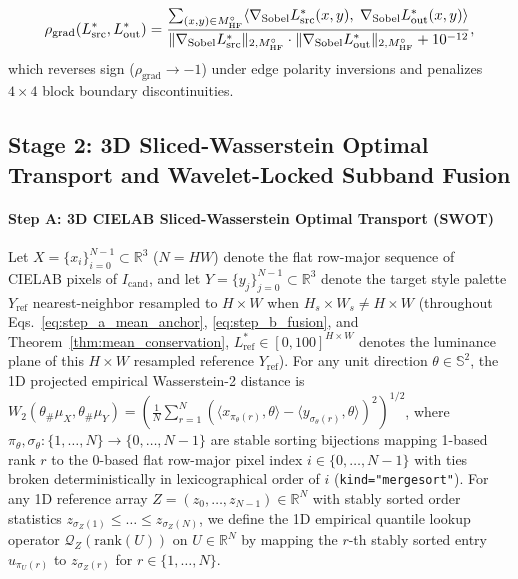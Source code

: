 \documentclass[conference,10pt]{IEEEtran}
\begin{document}
\begin{equation}
\label{eq:sobel_corr}
\resizebox{0.89\columnwidth}{!}{$\displaystyle
\rho_{\text{grad}}(L^*_{\text{src}}, L^*_{\text{out}}) = \frac{\sum_{(x,y) \in M_{\text{HF}}^\circ} \langle \nabla_{\text{Sobel}} L^*_{\text{src}}(x,y),\; \nabla_{\text{Sobel}} L^*_{\text{out}}(x,y) \rangle}{\|\nabla_{\text{Sobel}} L^*_{\text{src}}\|_{2, M_{\text{HF}}^\circ} \cdot \|\nabla_{\text{Sobel}} L^*_{\text{out}}\|_{2, M_{\text{HF}}^\circ} + 10^{-12}},
$}
\end{equation}
which reverses sign ($\rho_{\text{grad}} \to -1$) under edge polarity inversions and penalizes $4\times 4$ block boundary discontinuities.

\subsection{Stage 2: 3D Sliced-Wasserstein Optimal Transport and Wavelet-Locked Subband Fusion}
\paragraph{Step A: 3D CIELAB Sliced-Wasserstein Optimal Transport (SWOT)}
Let $X = \{x_i\}_{i=0}^{N-1} \subset \mathbb{R}^3$ ($N = HW$) denote the flat row-major sequence of CIELAB pixels of $I_{\text{cand}}$, and let $Y = \{y_j\}_{j=0}^{N-1} \subset \mathbb{R}^3$ denote the target style palette $Y_{\text{ref}}$ nearest-neighbor resampled to $H \times W$ when $H_s \times W_s \ne H \times W$ (throughout Eqs.~\ref{eq:step_a_mean_anchor}, \ref{eq:step_b_fusion}, and Theorem~\ref{thm:mean_conservation}, $L^*_{\text{ref}} \in [0, 100]^{H \times W}$ denotes the luminance plane of this $H \times W$ resampled reference $Y_{\text{ref}}$). For any unit direction $\theta \in \mathbb{S}^2$, the 1D projected empirical Wasserstein-2 distance is $W_2(\theta_\#\mu_X, \theta_\#\mu_Y) = \left(\frac{1}{N} \sum_{r=1}^N (\langle x_{\pi_\theta(r)}, \theta \rangle - \langle y_{\sigma_\theta(r)}, \theta \rangle)^2\right)^{1/2}$, where $\pi_\theta, \sigma_\theta : \{1, \dots, N\} \to \{0, \dots, N-1\}$ are stable sorting bijections mapping 1-based rank $r$ to the 0-based flat row-major pixel index $i \in \{0, \dots, N-1\}$ with ties broken deterministically in lexicographical order of $i$ (\texttt{kind="mergesort"}). For any 1D reference array $Z = (z_0, \dots, z_{N-1}) \in \mathbb{R}^N$ with stably sorted order statistics $z_{\sigma_Z(1)} \le \dots \le z_{\sigma_Z(N)}$, we define the 1D empirical quantile lookup operator $\mathcal{Q}_Z(\mathrm{rank}(U))$ on $U \in \mathbb{R}^N$ by mapping the $r$-th stably sorted entry $u_{\pi_U(r)}$ to $z_{\sigma_Z(r)}$ for $r \in \{1, \dots, N\}$.
\end{document}
